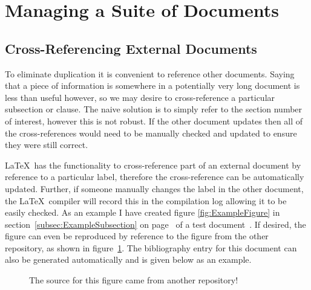 \section{Managing a Suite of Documents}
\label{sec:ManagingASuiteOfDocuments}

\subsection{Cross-Referencing External Documents}
\label{subsec:CrossReferencingExternalDocuments}

To eliminate duplication it is convenient to reference other documents. Saying that a piece of information is somewhere in a potentially very long document is less than useful however, so we may desire to cross-reference a particular subsection or clause. The naive solution is to simply refer to the section number of interest, however this is not robust. If the other document updates then all of the cross-references would need to be manually checked and updated to ensure they were still correct.

\LaTeX\ has the functionality to cross-reference part of an external document by reference to a particular label, therefore the cross-reference can be automatically updated. Further, if someone manually changes the label in the other document, the \LaTeX\ compiler will record this in the compilation log allowing it to be easily checked. As an example I have created figure \ref{fig:ExampleFigure} in section~\ref{subsec:ExampleSubsection} on page~\pageref{fig:ExampleFigure} of a test document~\cite{AnotherDocumentToCrossReference}. If desired, the figure can even be reproduced by reference to the figure from the other repository, as shown in figure~\ref{fig:ReproducedFigure}. The bibliography entry for this document can also be generated automatically and is given below as an example.

\begin{figure}[H]
	\centering
	\begin{tikzpicture}[scale=2.5, alt={A skewed grid broken in two with dots indicating an arbitrarily sized gap in the middle. Some cells are shaded in colour and there are labels in the centre of the cells.}]
		
	\end{tikzpicture}
	\caption[Example figure]{The source for this figure\protect{\footnotemark} came from another repository!}
	\label{fig:ReproducedFigure}
\end{figure}

